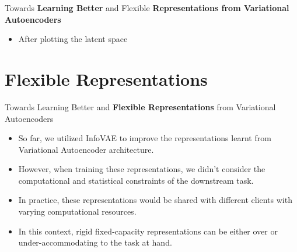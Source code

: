 \documentclass[hyperref={colorlinks,citecolor=blue,linkcolor=blue,urlcolor=blue}]{beamer}
\begin{document}
\begin{frame}{ Towards \textbf{Learning Better} and Flexible \textbf{Representations from Variational Autoencoders} \vspace{0.3em}}
  \begin{itemize}
    \item After plotting the latent space
  \end{itemize}
\end{frame}

\section{Flexible Representations}

\begin{frame}{ Towards Learning Better and \textbf{Flexible Representations} from Variational Autoencoders \vspace{0.3em}}
  \begin{itemize}
    \item So far, we utilized InfoVAE to improve the representations learnt from Variational Autoencoder architecture.
    \item However, when training these representations, we didn't consider the computational and statistical constraints of the downstream task.
    \item In practice, these representations would be shared with different clients with varying computational resources. 
    \item In this context, rigid fixed-capacity representations can be either over or under-accommodating to the task at hand.
  \end{itemize}
\end{frame}
\end{document}
